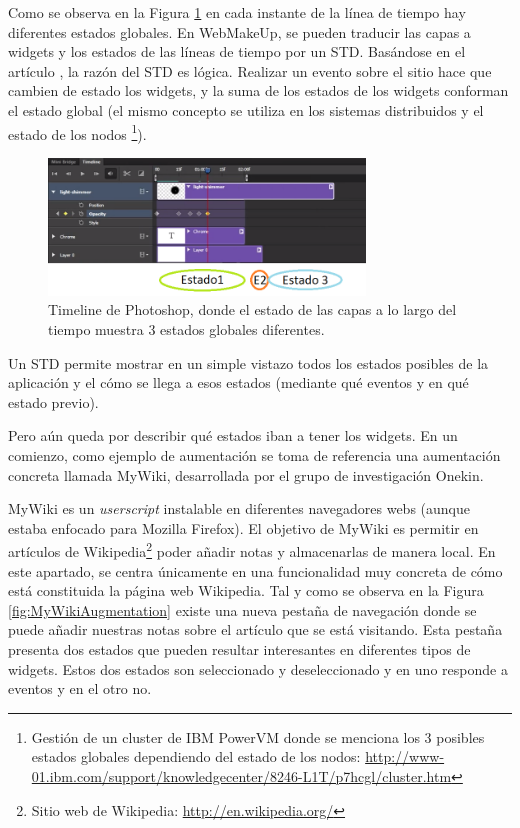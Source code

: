 Como se observa en la Figura \ref{fig:PhotoshopTimeline} en cada instante de la línea de tiempo hay diferentes estados globales. En WebMakeUp, se pueden traducir las capas a widgets y los estados de las líneas de tiempo por un STD. Basándose en el artículo  \cite{WhoMovedMyState}, la razón del STD es lógica. Realizar un evento sobre el sitio hace que cambien de estado los widgets, y la suma de los estados de los widgets conforman el estado global (el mismo concepto se utiliza en los sistemas distribuidos y el estado de los nodos \footnote{Gestión de un cluster de IBM PowerVM donde se menciona los 3 posibles estados globales dependiendo del estado de los nodos: \url{http://www-01.ibm.com/support/knowledgecenter/8246-L1T/p7hcgl/cluster.htm}}).

\begin{figure}
\begin{center}
\includegraphics[width=0.75\textwidth]{figs/4-PhotoshopTimeline.png}
\caption{Timeline de Photoshop, donde el estado de las capas a lo largo del tiempo muestra 3 estados globales diferentes.}
\label{fig:PhotoshopTimeline}
\end{center}
\end{figure}

Un STD permite mostrar en un simple vistazo todos los estados posibles de la aplicación y el cómo se llega a esos estados (mediante qué eventos y en qué estado previo).

Pero aún queda por describir qué estados iban a tener los widgets. En un comienzo, como ejemplo de aumentación se toma de referencia una aumentación concreta llamada MyWiki, desarrollada por el grupo de investigación Onekin.

MyWiki es un \emph{userscript} instalable en diferentes navegadores webs (aunque estaba enfocado para Mozilla Firefox). El objetivo de MyWiki es permitir en artículos de Wikipedia\footnote{Sitio web de Wikipedia: \url{http://en.wikipedia.org/}} poder añadir notas y almacenarlas de manera local. En este apartado, se centra únicamente en una funcionalidad muy concreta de cómo está constituida la página web Wikipedia. Tal y como se observa en la Figura \ref{fig:MyWikiAugmentation} existe una nueva pestaña de navegación donde se puede añadir nuestras notas sobre el artículo que se está visitando. Esta pestaña presenta dos estados que pueden resultar interesantes en diferentes tipos de widgets. Estos dos estados son seleccionado y deseleccionado y en uno responde a eventos y en el otro no.


